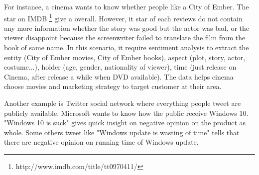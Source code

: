For instance, a cinema wants to know whether people like a City of Ember. The star on IMDB \footnote{http://www.imdb.com/title/tt0970411/} give a overall. However, it star of each reviews do not contain any more information whether the story was good but the actor was bad, or the viewer disappoint because the screenwriter failed to translate the film from the book of same name. In this scenario, it require sentiment analysis to extract the entity (City of Ember movies, City of Ember books), aspect (plot, story, actor, costume...), holder (age, gender, nationality of viewer), time (just release on Cinema, after release a while when DVD available). The data helps cinema choose movies and marketing strategy to target customer at their area.

Another example is Twitter social network where everything people tweet are publicly available. Microsoft wants to know how the public receive Windows 10. "Windows 10 is suck" gives quick insight on negative opinion on the product as whole. Some others tweet like "Windows update is wasting of time" tells that there are negative opinion on running time of Windows update.


